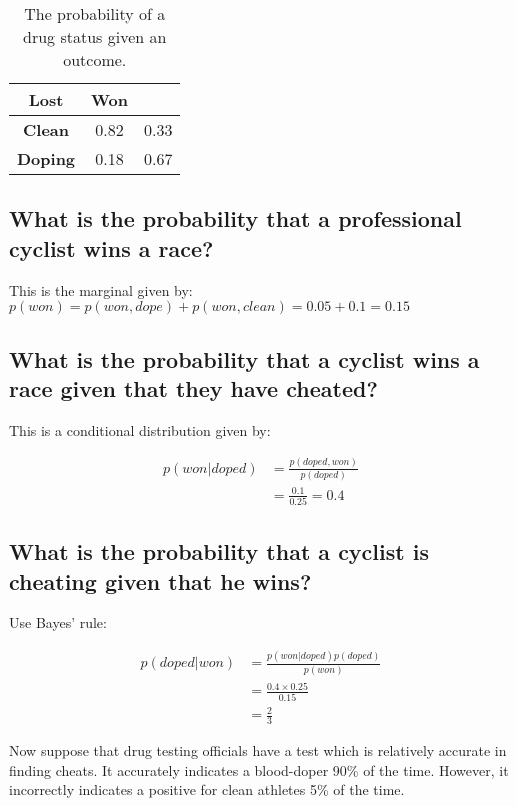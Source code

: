 \documentclass[11pt,fullpage]{book}
\begin{document}
\begin{table}[htbp]
  \centering
    \begin{tabular}{ccc}
    \toprule
     \textbf{Lost} & \textbf{Won} \\
    \midrule
    \textbf{Clean} & 0.82  & 0.33 \\
    \textbf{Doping} & 0.18  & 0.67 \\
    \bottomrule
    \end{tabular}%
  \caption{The probability of a drug status given an outcome.}%
  \label{tab:Probability_dopingInverted}
\end{table}%


\subsection{What is the probability that a professional cyclist wins a race?}
This is the marginal given by: $p(won) = p(won,dope) + p(won,clean) = 0.05 + 0.1 = 0.15$

\subsection{What is the probability that a cyclist wins a race given that they have cheated?}
This is  a conditional distribution given by:

\begin{equation}
\begin{align}
p(won|doped) &= \frac{p(doped,won)}{p(doped)}\\
&= \frac{0.1}{0.25} = 0.4
\end{align}
\end{equation}

\subsection{What is the probability that a cyclist is cheating given that he wins?}
Use Bayes' rule:

\begin{equation}
\begin{align}
p(doped|won) &= \frac{p(won|doped)p(doped)}{p(won)}\\
&= \frac{0.4\times 0.25}{0.15}\\
&= \frac{2}{3}
\end{align}
\end{equation}


Now suppose that drug testing officials have a test which is relatively accurate in finding cheats. It accurately indicates a blood-doper 90\% of the time. However, it incorrectly indicates a positive for clean athletes 5\% of the time. 
\end{document}
